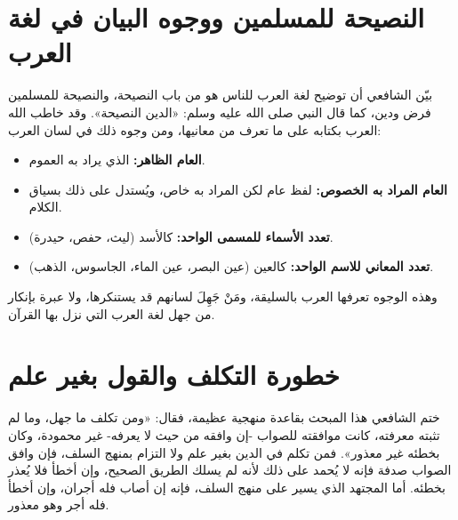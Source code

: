 \section{النصيحة للمسلمين ووجوه البيان في لغة العرب}
بيّن الشافعي أن توضيح لغة العرب للناس هو من باب النصيحة، والنصيحة للمسلمين فرض ودين، كما قال النبي صلى الله عليه وسلم: «الدين النصيحة».
وقد خاطب الله العرب بكتابه على ما تعرف من معانيها، ومن وجوه ذلك في لسان العرب:
\begin{itemize}
    \item \textbf{العام الظاهر:} الذي يراد به العموم.
    \item \textbf{العام المراد به الخصوص:} لفظ عام لكن المراد به خاص، ويُستدل على ذلك بسياق الكلام.
    \item \textbf{تعدد الأسماء للمسمى الواحد:} كالأسد (ليث، حفص، حيدرة).
    \item \textbf{تعدد المعاني للاسم الواحد:} كالعين (عين البصر، عين الماء، الجاسوس، الذهب).
\end{itemize}
وهذه الوجوه تعرفها العرب بالسليقة، ومَنْ جَهِلَ لسانهم قد يستنكرها، ولا عبرة بإنكار من جهل لغة العرب التي نزل بها القرآن.

\section{خطورة التكلف والقول بغير علم}
ختم الشافعي هذا المبحث بقاعدة منهجية عظيمة، فقال: «ومن تكلف ما جهل، وما لم تثبته معرفته، كانت موافقته للصواب -إن وافقه من حيث لا يعرفه- غير محمودة، وكان بخطئه غير معذور».
فمن تكلم في الدين بغير علم ولا التزام بمنهج السلف، فإن وافق الصواب صدفة فإنه لا يُحمد على ذلك لأنه لم يسلك الطريق الصحيح، وإن أخطأ فلا يُعذر بخطئه. أما المجتهد الذي يسير على منهج السلف، فإنه إن أصاب فله أجران، وإن أخطأ فله أجر وهو معذور.